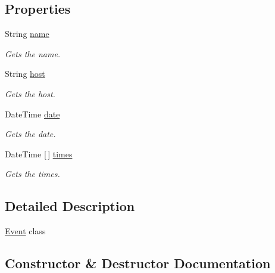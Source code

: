 \subsection*{Properties}
\begin{DoxyCompactItemize}
\item 
String \hyperlink{classProject1_1_1Event_a04f15bb124d4410eece35779864589bf}{name}
\begin{DoxyCompactList}\small\item\em Gets the name. \end{DoxyCompactList}\item 
String \hyperlink{classProject1_1_1Event_a50ac8e67c15316ea93bcbca4b7951fee}{host}
\begin{DoxyCompactList}\small\item\em Gets the host. \end{DoxyCompactList}\item 
Date\+Time \hyperlink{classProject1_1_1Event_a4a7ca6b514ebc64a364c4aac4c7a3b5f}{date}
\begin{DoxyCompactList}\small\item\em Gets the date. \end{DoxyCompactList}\item 
Date\+Time \mbox{[}$\,$\mbox{]} \hyperlink{classProject1_1_1Event_acc6d286c687a5ac9256a146d99de1cb6}{times}
\begin{DoxyCompactList}\small\item\em Gets the times. \end{DoxyCompactList}\end{DoxyCompactItemize}


\subsection{Detailed Description}
\hyperlink{classProject1_1_1Event}{Event} class 



\subsection{Constructor \& Destructor Documentation}
\mbox{\label{classProject1_1_1Event_a55c477aa9e921902fd85ff505c93b661}} 

